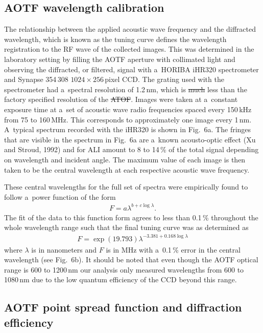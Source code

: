 \documentclass[amtd, online, hvmath]{copernicus}
\providecommand{\DIFadd}[1]{{\protect\color{blue}\uwave{#1}}} %
\providecommand{\DIFdel}[1]{{\protect\color{red}\sout{#1}}}                      %
\providecommand{\DIFaddbegin}{} %
\providecommand{\DIFaddend}{} %
\providecommand{\DIFdelbegin}{} %
\providecommand{\DIFdelend}{} %
\begin{document}
\subsection{AOTF wavelength calibration}

The relationship between the applied acoustic wave frequency and the
diffracted wavelength, which is known as the tuning curve defines the
wavelength registration to the RF wave of the collected images. This
was determined in the laboratory setting by filling the AOTF aperture
with collimated light and observing the diffracted, or filtered,
signal with a~HORIBA iHR320 spectrometer and Synapse 354\,308
$1024\times 256$\,pixel CCD. The grating used with the spectrometer
had a~spectral resolution of 1.2\,\unit{nm}, which is \DIFdelbegin \DIFdel{much }\DIFdelend less than
the factory specified resolution of the \DIFdelbegin \DIFdel{ATOF}\DIFdelend \DIFaddbegin \DIFadd{AOTF}\DIFaddend . Images were taken at
a~constant exposure time at a~set of acoustic wave radio frequencies
spaced every 150\,\unit{kHz} from 75 to 160\,\unit{MHz}. This
corresponds to approximately one image every 1\,\unit{nm}. A~typical
spectrum recorded with the iHR320 is shown in Fig.~6a. The fringes
that are visible in the spectrum in Fig.~6a are a~known acousto-optic
effect (Xu and Stroud, 1992) and for ALI amount to 8 to 14\,{\%} of
the total signal depending on wavelength and incident angle. The
maximum value of each image is then taken to be the central wavelength
at each respective acoustic wave frequency.

These central wavelengths for the full set of spectra were empirically
found to follow a~power function of the form
\begin{align}
F=a\lambda^{b+c\log \lambda}.
\end{align}
The fit of the data to this function form agrees to less than
0.1\,{\%} throughout the whole wavelength range such that the final
tuning curve was as determined as
\begin{align}
F=\exp \left(19.793 \right)\lambda^{-3.381+0.168\log \lambda}
\end{align}
where $\lambda$ is in nanometers and $F$ is in MHz with a~0.1\,{\%}
error in the central wavelength (see Fig.~6b). It should be noted that
even though the AOTF optical range is 600 to 1200\,\unit{nm} our
analysis only measured wavelengths from 600 to 1080\,\unit{nm} due to
the low quantum efficiency of the CCD beyond this range.

\subsection{AOTF point spread function and diffraction efficiency}
\end{document}
